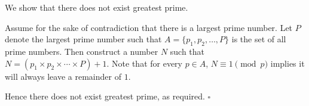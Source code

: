 We show that there does not exist greatest prime.

Assume for the sake of contradiction that there is a largest prime number.
Let $P$ denote the largest prime number such that $A = \{p_{1}, p_{2}, \ldots, P\}$ is the set of all prime numbers.
Then construct a number $N$ such that $N = (p_{1} \times p_{2} \times \cdots \times P) + 1$.
Note that for every $p \in A$, $N \equiv 1 \pmod{p}$ implies it will always leave a remainder of $1$.

Hence there does not exist greatest prime, as required. \hfill$\square$